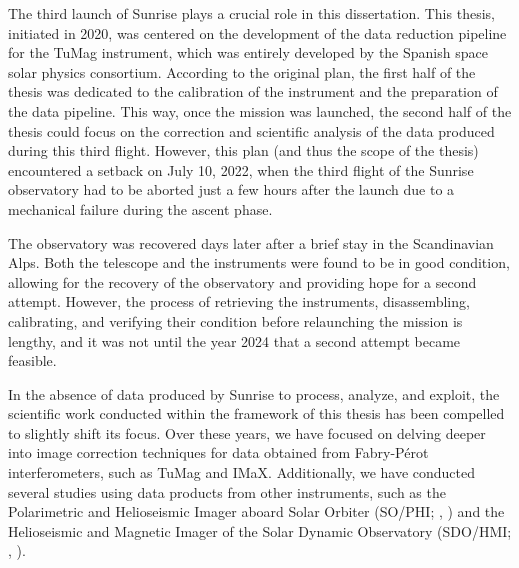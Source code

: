 The third launch of Sunrise plays a crucial role in this dissertation. This thesis, initiated in 2020, was centered on the development of the data reduction pipeline for the TuMag instrument, which was entirely developed by the Spanish space solar physics consortium. According to the original plan, the first half of the thesis was dedicated to the calibration of the instrument and the preparation of the data pipeline. This way, once the mission was launched, the second half of the thesis could focus on the correction and scientific analysis of the data produced during this third flight. However, this plan (and thus the scope of the thesis) encountered a setback on July 10, 2022, when the third flight of the Sunrise observatory had to be aborted just a few hours after the launch due to a mechanical failure during the ascent phase.

The observatory was recovered days later after a brief stay in the Scandinavian Alps. Both the telescope and the instruments were found to be in good condition, allowing for the recovery of the observatory and providing hope for a second attempt. However, the process of retrieving the instruments, disassembling, calibrating, and verifying their condition before relaunching the mission is lengthy, and it was not until the year 2024 that a second attempt became feasible.

In the absence of data produced by Sunrise to process, analyze, and exploit, the scientific work conducted within the framework of this thesis has been compelled to slightly shift its focus. Over these years, we have focused on delving deeper into image correction techniques for data obtained from Fabry-Pérot interferometers, such as TuMag and IMaX. Additionally, we have conducted several studies using data products from other instruments, such as the Polarimetric and Helioseismic Imager aboard Solar Orbiter (SO/PHI; \citealt{PHI}, \citealt{SO}) and the Helioseismic and Magnetic Imager of the Solar Dynamic Observatory (SDO/HMI; \citealt{hmi1}, \citealt{SDO}).

